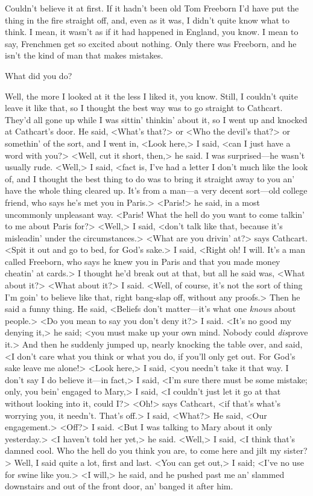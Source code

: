 \begin{dialogue}
 Couldn't believe it at first. If it hadn't been old Tom Freeborn I'd have put the thing in the fire straight off, and, even as it was, I didn't quite know what to think. I mean, it wasn't as if it had happened in England, you know. I mean to say, Frenchmen get so excited about nothing. Only there was Freeborn, and he isn't the kind of man that makes mistakes.

 What did you do?

 Well, the more I looked at it the less I liked it, you know. Still, I couldn't quite leave it like that, so I thought the best way was to go straight to Cathcart. They'd all gone up while I was sittin' thinkin' about it, so I went up and knocked at Cathcart's door.  He said, <What's that?> or <Who the devil's that?> or somethin' of the sort, and I went in, <Look here,> I said, <can I just have a word with you?> <Well, cut it short, then,> he said. I was surprised—he wasn't usually rude. <Well,> I said, <fact is, I've had a letter I don't much like the look of, and I thought the best thing to do was to bring it straight away to you an' have the whole thing cleared up. It's from a man—a very decent sort—old college friend, who says he's met you in Paris.> <Paris!> he said, in a most uncommonly unpleasant way. <Paris!  What the hell do you want to come talkin' to me about Paris for?> <Well,> I said, <don't talk like that, because it's misleadin' under the circumstances.> <What are you drivin' at?> says Cathcart. <Spit it out and go to bed, for God's sake.> I said, <Right oh! I will. It's a man called Freeborn, who says he knew you in Paris and that you made money cheatin' at cards.> I thought he'd break out at that, but all he said was, <What about it?> <What about it?> I said. <Well, of course, it's not the sort of thing I'm goin' to believe like that, right bang-slap off, without any proofs.> Then he said a funny thing. He said, <Beliefs don't matter—it's what one \emph{knows} about people.> <Do you mean to say you don't deny it?> I said. <It's no good my denying it,> he said; <you must make up your own mind. Nobody could \emph{dis}prove it.> And then he suddenly jumped up, nearly knocking the table over, and said, <I don't care what you think or what you do, if you'll only get out. For God's sake leave me alone!> <Look here,> I said, <you needn't take it that way. I don't say I do believe it—in fact,> I said, <I'm sure there must be some mistake; only, you bein' engaged to Mary,> I said, <I couldn't just let it go at that without looking into it, could I\@?> <Oh!> says Cathcart, <if that's what's worrying you, it needn't. That's off.> I said, <What?> He said, <Our engagement.> <Off?> I said. <But I was talking to Mary about it only yesterday.> <I haven't told her yet,> he said. <Well,> I said, <I think that's damned cool.  Who the hell do you think you are, to come here and jilt my sister?> Well, I said quite a lot, first and last. <You can get out,> I said; <I've no use for swine like you.> <I will,> he said, and he pushed past me an' slammed downstairs and out of the front door, an' banged it after him.


\end{dialogue}
